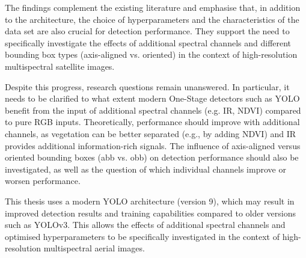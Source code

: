 The findings complement the existing literature and emphasise that, in addition to the architecture, the choice of hyperparameters and the characteristics of the data set are also crucial for detection performance. They support the need to specifically investigate the effects of additional spectral channels and different bounding box types (axis-aligned vs. oriented) in the context of high-resolution multispectral satellite images.

Despite this progress, research questions remain unanswered. In particular, it needs to be clarified to what extent modern One-Stage detectors such as \acrshort{YOLO} benefit from the input of additional spectral channels (e.g. \Acrfull{IR}, \acrshort{NDVI}) compared to pure \acrshort{RGB} inputs. Theoretically, performance should improve with additional channels, as vegetation can be better separated (e.g., by adding \acrshort{NDVI}) and \acrshort{IR} provides additional information-rich signals. The influence of axis-aligned versus oriented bounding boxes (\acrshort{abb} vs. \acrshort{obb}) on detection performance should also be investigated, as well as the question of which individual channels improve or worsen performance.
  
This thesis uses a modern \acrshort{YOLO} architecture (version 9), which may result in improved detection results and training capabilities compared to older versions such as YOLOv3. This allows the effects of additional spectral channels and optimised hyperparameters to be specifically investigated in the context of high-resolution multispectral aerial images.




